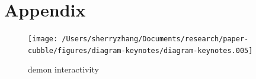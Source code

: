 \documentclass[
]{jss}
\begin{document}
\hypertarget{appendix}{%
\section{Appendix}\label{appendix}}

\begin{CodeChunk}
\begin{figure}

{\centering \texttt{[image: /Users/sherryzhang/Documents/research/paper-cubble/figures/diagram-keynotes/diagram-keynotes.005]} 

}

\caption[demon interactivity]{demon interactivity}\label{fig:illu-interactive-2}
\end{figure}
\end{CodeChunk}


\end{document}
